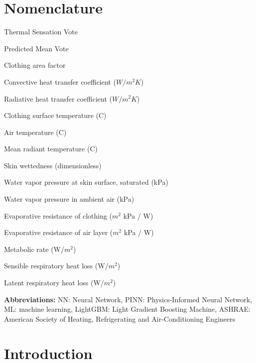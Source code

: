 \documentclass[final,1p,times]{elsarticle}
\begin{document}
\section*{Nomenclature}
\begin{description}[labelsep=1em, leftmargin=!, labelindent=0pt, align=left, font=\normalfont, itemsep=0pt]
  \item[$TSV$] Thermal Sensation Vote
  \item[$PMV$] Predicted Mean Vote
  \item[$f_{cl}$] Clothing area factor
  \item[$h_c$] Convective heat transfer coefficient ($W/m^2 K$)
  \item[$h_r$] Radiative heat transfer coefficient ($W/m^2 K$)
  \item[$T_{cl}$] Clothing surface temperature (\textdegree{}C)
  \item[$T_a$] Air temperature (\textdegree{}C)
  \item[$T_r$] Mean radiant temperature (\textdegree{}C)
  \item[$w$] Skin wettedness (dimensionless)
  \item[$P_{sk,s}$] Water vapor pressure at skin surface, saturated (kPa)
  \item[$P_a$] Water vapor pressure in ambient air (kPa)
  \item[$R_{e,cl}$] Evaporative resistance of clothing ($m^2$ kPa / W)
  \item[$R_{e,a}$] Evaporative resistance of air layer ($m^2$ kPa / W)
  \item[$M$] Metabolic rate (W/$m^2$)
  \item[$C_{res}$] Sensible respiratory heat loss (W/$m^2$)
  \item[$E_{res}$] Latent respiratory heat loss (W/$m^2$)
\end{description}
\vspace{0.1cm}
\textbf{Abbreviations:} NN: Neural Network, PINN: Physics-Informed Neural Network, ML: machine learning, LightGBM: Light Gradient Boosting Machine, ASHRAE: American Society of Heating, Refrigerating and Air-Conditioning Engineers

\section{Introduction}

\end{document}
